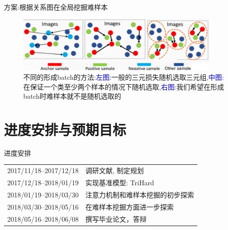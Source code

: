 \documentclass[notes]{beamer}
\begin{document}
\begin{frame}
	{方案:根据关系图在全局挖掘难样本} 
	\begin{figure}
		\centering 
		\includegraphics[width=0.9\textwidth]{2018-03-12-11-21-00.png}	
		\caption{不同的形成batch的方法:\textcolor{blue}{左图:}一般的三元损失随机选取三元组,\textcolor{blue}{中图:}\cite{hermans2017defense}在保证一个类至少两个样本的情况下随机选取,\textcolor{blue}{右图:}我们希望在形成batch时难样本就不是随机选取的}
	\end{figure}
\end{frame}


\section{进度安排与预期目标}
\begin{frame}
	{进度安排}
\begin{table}
	\begin{tabular}{ll}
		\toprule
		2017/11/18--2017/12/18  & 调研文献, 制定规划                                        \\
		2017/12/18--2018/01/19 & 实现基准模型: TriHard \cite{hermans2017defense} \\
		2018/01/19--2018/03/30 & 注意力机制和难样本挖掘的初步探索                                                \\
		2018/03/30--2018/05/16 & 在难样本挖掘方面进一步探索                                                \\
		2018/05/16--2018/06/08 & 撰写毕业论文，答辩                              \\
		\bottomrule
	\end{tabular}
\end{table}
\end{frame}
\end{document}
